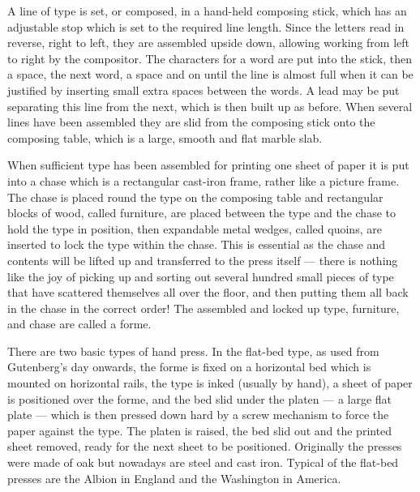 \documentclass[10pt,a4paper,extrafontsizes]{memoir}
\newcommand{\PWnote}[2]{}
\begin{document}
\begin{paracol}{2}
\switchEng
    A line of type is set, or composed, in a hand-held 
composing stick, which
has an adjustable stop which is set to the required line length. Since the
letters read in reverse, right to left, they are assembled upside down, 
allowing working from left to right by the compositor. The characters for
a word are put into the stick, then a space, the next word, a space and on
until the line is almost full when it can be justified by inserting small extra 
spaces between the words. A lead may be put separating this line from the next,
which is then built up as before. When several lines have been assembled they
are slid from the composing stick onto the composing table, which is
a large, smooth and flat marble slab.

    When sufficient type has been assembled for printing one sheet of paper
it is put into a chase which is a rectangular cast-iron frame, 
rather like a picture frame. The chase is placed round the type
on the composing table and rectangular
blocks of wood, called furniture, are placed between the type and the chase
to hold the type in position, then expandable metal wedges, called 
quoins,
are inserted to lock the type within the chase. This is essential as the
chase and contents will be lifted up and transferred to the press itself ---
there is nothing like the joy of picking up and sorting out several hundred
small pieces of type that have scattered themselves all over the floor, and 
then putting them all back in the chase in the correct order! The assembled
and locked up type, furniture, and chase are called a forme.

\PWnote{2009/03/29}{Revised description of composing type and added paras 
        about kinds of hand presses}
    There are two basic types of hand press. In the 
flat-bed type, as 
used from Gutenberg's day onwards, the forme is fixed on a horizontal bed
which is mounted on horizontal rails, the type is inked (usually by hand), 
a sheet of paper is positioned over the forme, and the bed
slid under the platen --- a large flat plate --- which is then pressed
down hard by a screw mechanism to force the paper against the type. The platen 
is raised, the bed slid out and the printed sheet removed, ready for the next
sheet to be positioned. Originally the presses were made of oak but
nowadays are steel and cast iron. Typical of
the flat-bed presses are the  Albion in England 
and the Washington in America.


\end{paracol}
\end{document}
